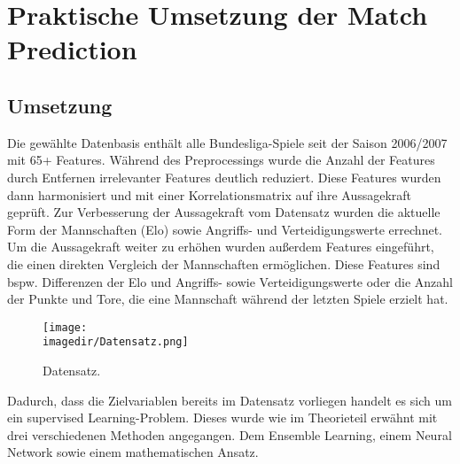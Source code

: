 \chapter{Praktische Umsetzung der Match Prediction}

\section{Umsetzung}
Die gewählte Datenbasis enthält alle Bundesliga-Spiele seit der Saison 2006/2007 mit
65+ Features. Während des Preprocessings wurde die Anzahl der Features durch
Entfernen irrelevanter Features deutlich reduziert. Diese Features wurden dann
harmonisiert und mit einer Korrelationsmatrix auf ihre Aussagekraft geprüft.
Zur Verbesserung der Aussagekraft vom Datensatz wurden die aktuelle Form der Mannschaften (Elo) sowie Angriffs- und Verteidigungswerte errechnet. Um die Aussagekraft weiter zu erhöhen wurden außerdem Features eingeführt, die einen direkten Vergleich der Mannschaften ermöglichen.
Diese Features sind bspw. Differenzen der Elo und Angriffs- sowie Verteidigungswerte oder die Anzahl der Punkte und Tore, die eine Mannschaft während der letzten Spiele erzielt hat.

\begin{figure}[H]
	
	\centering
	\texttt{[image: \\imagedir/Datensatz.png]}
	\captionsetup{format=hang}
	\caption[Datensatz]{\label{fig:test}Datensatz.}
	
\end{figure}

Dadurch, dass die Zielvariablen bereits im Datensatz  vorliegen
handelt es sich um ein supervised Learning-Problem. Dieses wurde
wie im Theorieteil erwähnt mit drei verschiedenen Methoden angegangen.
Dem Ensemble Learning, einem Neural Network sowie einem mathematischen Ansatz.

